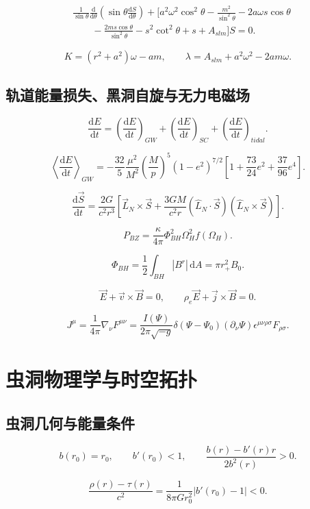 \documentclass[UTF8,11pt,a4paper]{ctexart}
\newcommand{\dd}{\mathrm{d}}
\begin{document}
\begin{align*}
&\frac{1}{\sin\theta}\frac{\dd}{\dd\theta}
\left(\sin\theta\frac{\dd S}{\dd\theta}\right)
+\Biggl[a^2\omega^2\cos^2\theta-\frac{m^2}{\sin^2\theta}
-2a\omega s\cos\theta\\
&\qquad-\frac{2ms\cos\theta}{\sin^2\theta}
-s^2\cot^2\theta+s+A_{slm}\Biggr]S=0.
\end{align*}

\[
K=(r^2+a^2)\omega-am,\qquad
\lambda=A_{slm}+a^2\omega^2-2am\omega.
\]

\subsection{轨道能量损失、黑洞自旋与无力电磁场}

\[
\frac{\dd E}{\dd t}
=\left(\frac{\dd E}{\dd t}\right)_{GW}
+\left(\frac{\dd E}{\dd t}\right)_{SC}
+\left(\frac{\dd E}{\dd t}\right)_{tidal}.
\]

\[
\left\langle\frac{\dd E}{\dd t}\right\rangle_{GW}
=-\frac{32}{5}\frac{\mu^2}{M^2}\left(\frac{M}{p}\right)^5
(1-e^2)^{7/2}
\left[1+\frac{73}{24}e^2+\frac{37}{96}e^4\right].
\]

\[
\frac{\dd\vec S}{\dd t}
=\frac{2G}{c^2r^3}\left[\vec L_N\times\vec S
+\frac{3GM}{c^2r}\left(\hat L_N\cdot\vec S\right)
\left(\hat L_N\times\vec S\right)\right].
\]

\[
P_{BZ}=\frac{\kappa}{4\pi}\Phi_{BH}^2\Omega_H^2f(\Omega_H).
\]

\[
\Phi_{BH}=\frac12\int_{BH}|B^r|\,\dd A=\pi r_+^2B_0.
\]

\[
\vec E+\vec v\times\vec B=0,\qquad
\rho_e\vec E+\vec j\times\vec B=0.
\]

\[
J^\mu=\frac{1}{4\pi}\nabla_\nu F^{\mu\nu}
=\frac{I(\Psi)}{2\pi\sqrt{-g}}\delta(\Psi-\Psi_0)
(\partial_\nu\Psi)\epsilon^{\mu\nu\rho\sigma}F_{\rho\sigma}.
\]

\section{虫洞物理学与时空拓扑}

\subsection{虫洞几何与能量条件}

\[
b(r_0)=r_0,\qquad b'(r_0)<1,\qquad
\frac{b(r)-b'(r)r}{2b^2(r)}>0.
\]

\[
\frac{\rho(r)-\tau(r)}{c^2}
=\frac{1}{8\pi Gr_0^2}|b'(r_0)-1|<0.
\]
\end{document}

